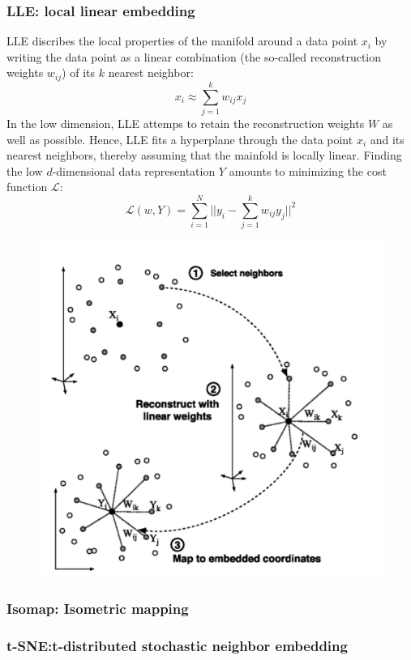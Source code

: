 \subsubsection{LLE: local linear embedding}
LLE discribes the local properties of the manifold around a data point \(x_i\) by writing the data point as a linear combination (the so-called reconstruction weights \(w_{ij}\)) of its \(k\) nearest neighbor:
\[
x_i \approx \sum_{j = 1}^k w_{ij}x_j
\]
In the low dimension, LLE attemps to retain the reconstruction weights \(W\) as well as possible. Hence, LLE fits a hyperplane through the data point \(x_i\) and its nearest neighbors, thereby assuming that the mainfold is locally linear.
Finding the low \(d\)-dimensional data representation \(Y\) amounts to minimizing the cost function \(\mathcal{L}\):
\[
\mathcal{L}(w,Y) = \sum_{i = 1}^{N}||y_i - \sum_{j = 1}^{k}w_{ij}y_j||^2
\]
\begin{figure}[!h]
    \includegraphics[width = \columnwidth]{figures/10/LLE.png}
\end{figure}
\subsubsection{Isomap: Isometric mapping}
\subsubsection{t-SNE:t-distributed stochastic neighbor embedding}